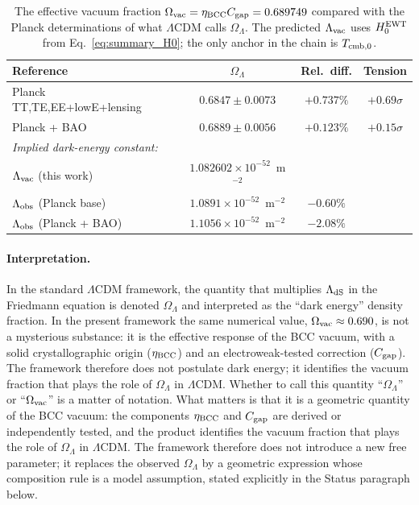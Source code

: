 \documentclass[10pt,a4paper]{article}
\begin{document}
\begin{table}[h]
	\centering
	\small
	\caption{The effective vacuum fraction
		\(\Omega_{\rm vac} = \eta_{\rm BCC} C_{\rm gap} = 0.689749\)
		compared with the Planck determinations of what $\Lambda$CDM calls
		\(\Omega_\Lambda\). The predicted $\Lambda_{\rm vac}$ uses
		\(H_0^{\rm EWT}\) from Eq.~\eqref{eq:summary_H0}; the only anchor in
		the chain is \(T_{\rm cmb,0}\).}
	\label{tab:summary_omega}
	\begin{tabular}{lccc}
		\toprule
		\textbf{Reference} & \(\Omega_\Lambda\) & \textbf{Rel.\ diff.} & \textbf{Tension} \\
		\midrule
		Planck TT,TE,EE+lowE+lensing & \(0.6847 \pm 0.0073\) & \(+0.737\%\) & \(+0.69\sigma\) \\
		Planck + BAO                 & \(0.6889 \pm 0.0056\) & \(+0.123\%\) & \(+0.15\sigma\) \\
		\midrule
		\multicolumn{4}{l}{\textit{Implied dark-energy constant:}} \\
		\(\Lambda_{\rm vac}\) (this work)      & \(1.082602\times 10^{-52}\)~m\(^{-2}\) & & \\
		\(\Lambda_{\rm obs}\) (Planck base)    & \(1.0891\times 10^{-52}\)~m\(^{-2}\)  & $-0.60\%$ & \\
		\(\Lambda_{\rm obs}\) (Planck + BAO)   & \(1.1056\times 10^{-52}\)~m\(^{-2}\)  & $-2.08\%$ & \\
		\bottomrule
	\end{tabular}
\end{table}

\paragraph{Interpretation.} In the standard $\Lambda$CDM framework,
the quantity that multiplies $\Lambda_{\rm dS}$ in the Friedmann
equation is denoted \(\Omega_\Lambda\) and interpreted as the
``dark energy'' density fraction. In the present framework the same
numerical value, $\Omega_{\rm vac} \approx 0.690$, is not a
mysterious substance: it is the effective response of the BCC
vacuum, with a solid crystallographic origin ($\eta_{\rm BCC}$) and
an electroweak-tested correction ($C_{\rm gap}$). The framework
therefore does not postulate dark energy; it identifies the vacuum
fraction that plays the role of \(\Omega_\Lambda\) in $\Lambda$CDM.
Whether to call this quantity ``\(\Omega_\Lambda\)'' or
``\(\Omega_{\rm vac}\)'' is a matter of notation. What matters is
that it is a geometric quantity of the BCC vacuum: the components
\(\eta_{\rm BCC}\) and \(C_{\rm gap}\) are derived or independently
tested, and the product identifies the vacuum fraction that plays
the role of \(\Omega_\Lambda\) in \(\Lambda\)CDM. The framework
therefore does not introduce a new free parameter; it replaces the
observed \(\Omega_\Lambda\) by a geometric expression whose
composition rule is a model assumption, stated explicitly in the
Status paragraph below.
\end{document}
